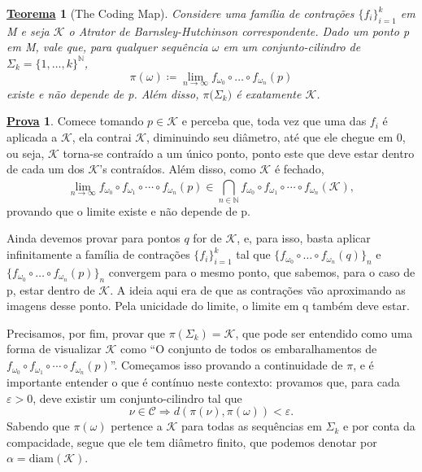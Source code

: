 \documentclass{article}
\newtheorem*{theorem*}{\underline{Teorema}}
\theoremstyle{definition}
\newtheorem*{proof*}{\underline{Prova}}
\begin{document}
\begin{theorem*}[The Coding Map]
	Considere uma família de contrações \(\{f_{i}\}_{i=1}^{k}\) em M e seja \(\mathcal{K}\) o Atrator de Barnsley-Hutchinson correspondente. Dado um ponto p
	em M, vale que, para qualquer sequência \(\omega \) em um conjunto-cilindro de \(\Sigma_{k}=\{1,\dotsc ,k\}^{\mathbb{N}}\),
	\[
		\pi(\omega )\coloneqq \lim_{n\to \infty}f_{\omega_{0}}\circ \dotsc \circ f_{\omega_{n}}(p)
	\]
	existe e não depende de p. Além disso, \(\pi \bigl(\Sigma_{k}\bigr)\) é exatamente \(\mathcal{K}\).
\end{theorem*}
\begin{proof*}
	Comece tomando \(p\in \mathcal{K}\) e perceba que, toda vez que uma das \(f_{i}\) é aplicada a \(\mathcal{K}\), ela contrai \(\mathcal{K}\), diminuindo seu diâmetro, até que ele
	chegue em 0, ou seja, \(\mathcal{K}\) torna-se contraído a um único ponto, ponto este que deve estar dentro de cada um dos \(\mathcal{K}\)'s contraídos.
	Além disso, como \(\mathcal{K}\) é fechado,
	\[
		\lim_{n\to \infty} f_{\omega_{0}}\circ f_{\omega_{1}}\circ\cdots\circ f_{\omega_{n}}(p)\in \bigcap_{n\in \mathbb{N}}^{}f_{\omega_{0}}\circ f_{\omega_{1}}\circ\cdots\circ f_{\omega_{n}} (\mathcal{K}),
	\]
	provando que o limite existe e não depende de p.

	Ainda devemos provar para pontos \(q\) for de \(\mathcal{K}\), e, para isso, basta aplicar infinitamente a família de contrações
	\(\{f_{i}\}_{i=1}^{k}\) tal que \(\{f_{\omega_{0}}\circ \dotsc \circ f_{\omega_{n}}(q)\}_{n}\) e \(\{f_{\omega_{0}}\circ \dotsc \circ
	f_{\omega_{n}}(p)\}_{n}\) convergem para o mesmo ponto, que sabemos, para o caso de p, estar dentro de \(\mathcal{K}\). A ideia aqui era de que as contrações vão aproximando as imagens desse ponto.
	Pela unicidade do limite, o limite em q também deve estar.

	Precisamos, por fim, provar que \(\pi(\Sigma_{k})=\mathcal{K} \), que pode ser entendido como uma forma de visualizar \(\mathcal{K}\) como
	``O conjunto de todos os embaralhamentos de \(f_{\omega_{0}}\circ f_{\omega_{1}}\circ\cdots\circ f_{\omega_{n}}(p)\)''. Começamos isso provando a continuidade de \(\pi \),
	e é importante entender o que é contínuo neste contexto: provamos que, para cada \(\varepsilon >0\), deve existir um conjunto-cilindro tal que
	\[
		\nu\in \mathcal{C} \Rightarrow d(\pi(\nu), \pi(\omega ))<\varepsilon.
	\]
	Sabendo que \(\pi (\omega )\) pertence a \(\mathcal{K}\) para todas as sequências em \(\Sigma_{k}\) e por conta da compacidade, segue que ele tem diâmetro finito, que podemos denotar por \(\alpha = \mathrm{diam}(\mathcal{K})\).


\end{proof*}
\end{document}
